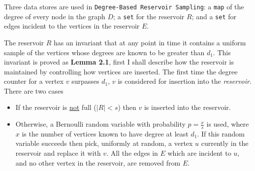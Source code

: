 \documentclass[11pt,twoside,a4paper]{report}
\begin{document}
\par Three data stores are used in \texttt{Degree-Based Reservoir Sampling}: a \texttt{map} of the degree of every node in the graph $D$; a \texttt{set} for the reservoir $R$; and a \texttt{set} for edges incident to the vertices in the reservoir $E$.

\par The reservoir $R$ has an invariant that at any point in time it contains a uniform sample of the vertices whose degrees are known to be greater than $d_1$. This invariant is proved as \textbf{Lemma 2.1}, first I shall describe how the reservoir is maintained by controlling how vertices are inserted. The first time the degree counter for a vertex $v$ surpasses $d_1$, $v$ is considered for insertion into the \textit{reservoir}. There are two cases
\begin{itemize}
	\item If the reservoir is \underline{not} full (\ie $|R|<s$) then $v$ is inserted into the reservoir.
	\item Otherwise, a Bernoulli random variable with probability $p=\frac{x}s$ is used, where $x$ is the number of vertices known to have degree at least $d_1$. If this random variable succeeds then pick, uniformly at random, a vertex $u$ currently in the reservoir and replace it with $v$. All the edges in $E$ which are incident to $u$, and no other vertex in the reservoir, are removed from $E$.
\end{itemize}
\end{document}
